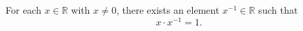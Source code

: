 For each $x \in \mathbb{R}$ with $x \neq 0$, there exists an element $x^{-1} \in \mathbb{R}$ such that
\begin{equation*}
x \cdot x^{-1} = 1.
\end{equation*}
